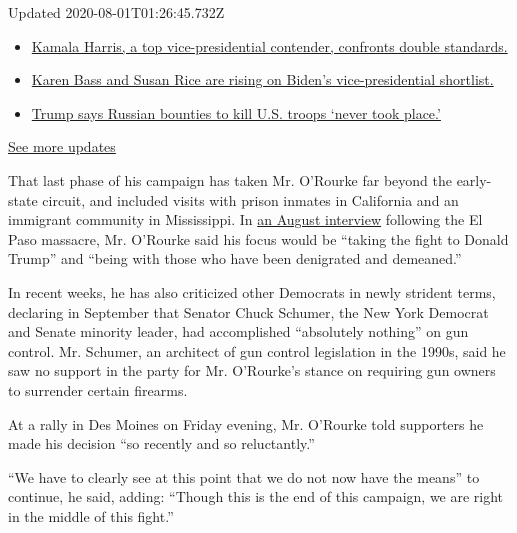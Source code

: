 Updated 2020-08-01T01:26:45.732Z

\begin{itemize}
\tightlist
\item
  \href{https://www.nytimes.com/2020/07/31/us/elections/biden-vs-trump.html?action=click\&pgtype=Article\&state=default\&region=MAIN_CONTENT_1\&context=storylines_live_updates\#link-29fdff45}{Kamala
  Harris, a top vice-presidential contender, confronts double
  standards.}
\item
  \href{https://www.nytimes.com/2020/07/31/us/elections/biden-vs-trump.html?action=click\&pgtype=Article\&state=default\&region=MAIN_CONTENT_1\&context=storylines_live_updates\#link-13ec3d9c}{Karen
  Bass and Susan Rice are rising on Biden's vice-presidential
  shortlist.}
\item
  \href{https://www.nytimes.com/2020/07/31/us/elections/biden-vs-trump.html?action=click\&pgtype=Article\&state=default\&region=MAIN_CONTENT_1\&context=storylines_live_updates\#link-49e9a016}{Trump
  says Russian bounties to kill U.S. troops `never took place.'}
\end{itemize}

\href{https://www.nytimes.com/2020/07/31/us/elections/biden-vs-trump.html?action=click\&pgtype=Article\&state=default\&region=MAIN_CONTENT_1\&context=storylines_live_updates}{See
more updates}

That last phase of his campaign has taken Mr. O'Rourke far beyond the
early-state circuit, and included visits with prison inmates in
California and an immigrant community in Mississippi. In
\href{https://www.nytimes.com/2019/08/15/us/politics/beto-orourke-2020-trump.html}{an
August interview} following the El Paso massacre, Mr. O'Rourke said his
focus would be ``taking the fight to Donald Trump'' and ``being with
those who have been denigrated and demeaned.''

In recent weeks, he has also criticized other Democrats in newly
strident terms, declaring in September that Senator Chuck Schumer, the
New York Democrat and Senate minority leader, had accomplished
``absolutely nothing'' on gun control. Mr. Schumer, an architect of gun
control legislation in the 1990s, said he saw no support in the party
for Mr. O'Rourke's stance on requiring gun owners to surrender certain
firearms.

At a rally in Des Moines on Friday evening, Mr. O'Rourke told supporters
he made his decision ``so recently and so reluctantly.''

``We have to clearly see at this point that we do not now have the
means'' to continue, he said, adding: ``Though this is the end of this
campaign, we are right in the middle of this fight.''

